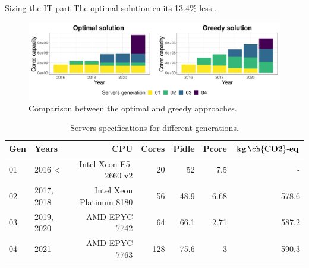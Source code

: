 \documentclass[Ligatures=TeX,table,svgnames,usetotalslideindicator,compress,10pt,aspectratio=169]{beamer}
\begin{document}
\begin{frame}{Sizing the IT part}
  The optimal solution emits 13.4\% less .
  \begin{center}
    \begin{figure}[h]    
      \centering
      \includegraphics[width=.9\textwidth]{images/cloud_federation_evolution_lifetime.png}
      \caption{Comparison between the optimal and greedy approaches.}
    \end{figure}    
  \end{center}  

  \begin{table}[h]
  \tiny
  \label{tab:servers_specs} 
  \caption{Servers specifications for different generations.} \centering
  \begin{tabular}{|l|l|r|r|r|r|r|}
  \hline    
  \textbf{Gen} & \textbf{Years} & \textbf{CPU} &   \textbf{Cores} & \textbf{Pidle}  & \textbf{Pcore}  & \textbf{$\mathbf{kg\,\ch{CO2}\text{-}eq}$}  \\
  \hline
  01      &  2016 < & Intel Xeon E5-2660 v2 & 20 & 52 & 7.5  & -   \\
  \hline
  02 & 2017, 2018 & Intel Xeon Platinum 8180 & 56 & 48.9 & 6.68  & 578.6   \\
  \hline
  03   & 2019, 2020 & AMD EPYC 7742  & 64 & 66.1 & 2.71  & 587.2 \\
  \hline
  04   & 2021      & AMD EPYC 7763 & 128 & 75.6 & 3     & 590.3 \\
  \hline
  
\end{tabular}  
\end{table}

\end{frame}
\end{document}
